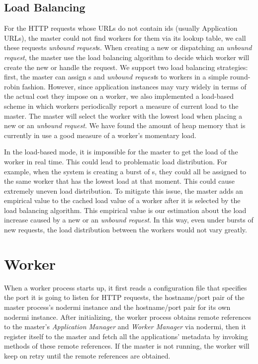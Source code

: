 \subsection{Load Balancing}
\label{sec:lb}

For the HTTP requests whose URLs do not contain \appins ids (usually
Application URLs), the master could not find workers for them via its lookup
table,  we call these requests \emph{unbound request}s. When creating a new
\appins or  dispatching an \emph{unbound request}, the master use the load
balancing algorithm  to decide which worker will create the new \appins or
handle the request. We support two load balancing strategies: first, the
master can assign \appins{}s and \emph{unbound request}s to workers in a
simple round- robin fashion. However, since application instances may vary
widely in terms of the actual cost they impose on a worker, we also
implemented a load-based scheme in which workers periodically report a measure
of current load to the master. The master will select the worker with the
lowest load when placing a new \appins or an \emph{unbound request}.  We have
found the amount of heap memory that is currently in use a good measure of a
worker's  momentary load.

In the load-based mode, it is impossible for the master to get the load of the
worker in real time. This could lead to problematic load distribution. For
example,  when the system is creating a burst of \appins{}s, they could all be
assigned to the same worker that has the lowest load at that moment.  This
could cause extremely uneven load distribution. To mitigate this issue, the
master adds an empirical value to the cached load value of a worker after it
is selected by the load balancing algorithm. This empirical value is our
estimation about the load increase caused by a new \appins or an \emph{unbound
request}. In this way, even under bursts of new requests,  the load
distribution between the workers would not vary greatly.


\section{Worker}
\label{sec:worker}

When a worker process starts up, it first reads a configuration file that
specifies the port it is going to listen for HTTP requests,  the hostname/port
pair of the master process's nodermi instance   and the hostname/port pair for
its own nodermi instance. After initializing, the worker process obtains
remote references to the master's \emph{Application Manager} and \emph{Worker
Manager} via nodermi, then it register itself to the master and fetch all the
applications' metadata by invoking methods of these remote references. If the
master is not running, the worker will keep on retry until the remote
references are obtained.


